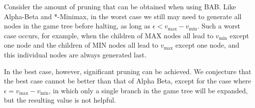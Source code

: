 \documentclass[runningheads]{llncs}
\newcommand{\vmax}{v_{\text{max}}}
\newcommand{\vmin}{v_{\text{min}}}
\begin{document}
Consider the amount of pruning that can be obtained when using BAB. 
Like Alpha-Beta and *-Minimax, in the worst case we still may need to generate all nodes in the game tree before halting, as long as $\epsilon<\vmax-\vmin$.  Such a worst case occurs, for example, when the children of MAX nodes all lead to $\vmin$ except one node and the children of MIN nodes all lead to $\vmax$ except one node, and this individual nodes are always generated last. 

In the best case, however, significant pruning can be achieved. We conjecture that the best case cannot be better than that of Alpha Beta, except for the case where $\epsilon=\vmax-\vmin$, in which only a single branch in the game tree will be expanded, but the resulting value is not helpful. 
\end{document}
